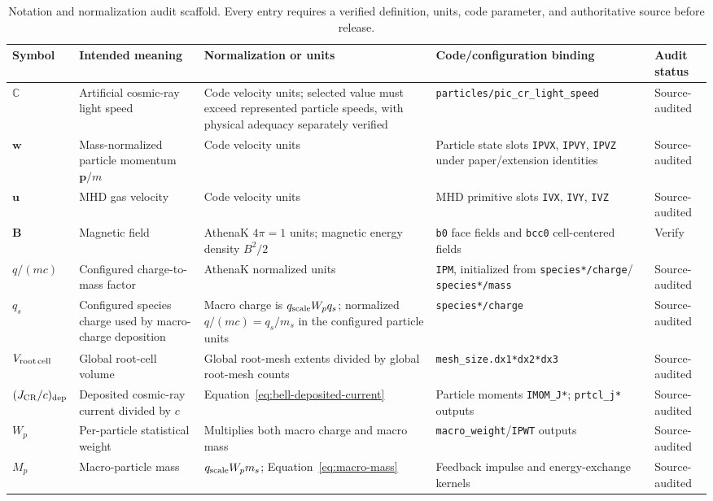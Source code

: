 \documentclass[twocolumn]{aastex701}
\begin{document}
\begin{table}[htbp]
\centering
\caption{Notation and normalization audit scaffold. Every entry requires a
verified definition, units, code parameter, and authoritative source before
release.}
\label{tab:notation}
\small
\begin{tabular}{p{} p{} p{}
                p{} p{}}
\toprule
Symbol & Intended meaning & Normalization or units & Code/configuration binding
& Audit status \\
\midrule
$\mathbb{C}$ & Artificial cosmic-ray light speed &
Code velocity units; selected value must exceed represented particle speeds,
with physical adequacy separately verified &
\texttt{particles/pic\_cr\_light\_speed} &
Source-audited \\
$\boldsymbol{w}$ & Mass-normalized particle momentum $\boldsymbol{p}/m$ &
Code velocity units & Particle state slots \texttt{IPVX}, \texttt{IPVY},
\texttt{IPVZ} under paper/extension identities &
Source-audited \\
$\boldsymbol{u}$ & MHD gas velocity & Code velocity units &
MHD primitive slots \texttt{IVX}, \texttt{IVY}, \texttt{IVZ} & Source-audited \\
$\boldsymbol{B}$ & Magnetic field & AthenaK $4\pi=1$ units; magnetic energy
density $B^2/2$ &
\texttt{b0} face fields and \texttt{bcc0} cell-centered fields & Verify \\
$q/(mc)$ & Configured charge-to-mass factor & AthenaK normalized units &
\texttt{IPM}, initialized from \texttt{species*/charge}/
\texttt{species*/mass} & Source-audited \\
$q_s$ & Configured species charge used by macro-charge deposition &
Macro charge is $q_{\rm scale}W_pq_s$; normalized
$q/(mc)=q_s/m_s$ in the configured particle units &
\texttt{species*/charge} & Source-audited \\
$V_{\rm root\,cell}$ & Global root-cell volume &
Global root-mesh extents divided by global root-mesh counts &
\texttt{mesh\_size.dx1*dx2*dx3} & Source-audited \\
$(J_{\rm CR}/c)_{\rm dep}$ & Deposited cosmic-ray current divided by $c$ &
Equation~\ref{eq:bell-deposited-current} &
Particle moments \texttt{IMOM\_J*}; \texttt{prtcl\_j*} outputs &
Source-audited \\
$W_p$ & Per-particle statistical weight &
Multiplies both macro charge and macro mass &
\texttt{macro\_weight}/\texttt{IPWT} outputs & Source-audited \\
$M_p$ & Macro-particle mass &
$q_{\rm scale}W_pm_s$; Equation~\ref{eq:macro-mass} &
Feedback impulse and energy-exchange kernels & Source-audited \\
\bottomrule
\end{tabular}
\end{table}
\end{document}
